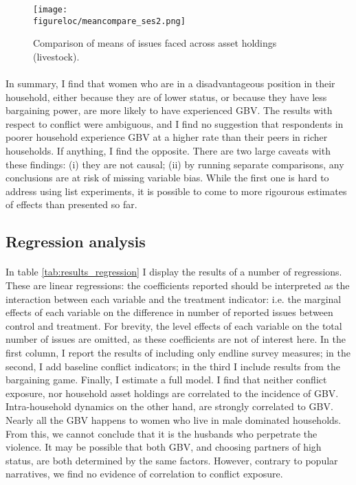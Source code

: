 \documentclass[11pt,a4paper]{scrartcl} %
\newcommand{\figureloc}{C:/Users/Koen/Dropbox/PhD/Papers/CongoGBV/Figures}
\begin{document}
\begin{figure}[H]
\texttt{[image: \\figureloc/meancompare\_ses2.png]}
  \caption{Comparison of means of issues faced across asset holdings (livestock).}
  \label{fig:meancompare_ses2}
\end{figure}

\paragraph{}
In summary, I find that women who are in a disadvantageous position in their household, either because they are of lower status, or because they have less bargaining power, are more likely to have experienced GBV. The results with respect to conflict were ambiguous, and I find no suggestion that respondents in poorer household experience GBV at a higher rate than their peers in richer households. If anything, I find the opposite. There are two large caveats with these findings: (i) they are not causal; (ii) by running separate comparisons, any conclusions are at risk of missing variable bias. While the first one is hard to address using list experiments, it is possible to come to more rigourous estimates of effects than presented so far. 

\subsection*{Regression analysis}
\paragraph{}
In table \ref{tab:results_regression} I display the results of a number of regressions. These are linear regressions: the coefficients reported should be interpreted as the interaction between each variable and the treatment indicator: i.e. the marginal effects of each variable on the difference in number of reported issues between control and treatment. For brevity, the level effects of each variable on the total number of issues are omitted, as these coefficients are not of interest here. In the first column, I report the results of including only endline survey measures; in the second, I add baseline conflict indicators; in the third I include results from the bargaining game. Finally, I estimate a full model. I find that neither conflict exposure, nor household asset holdings are correlated to the incidence of GBV. Intra-household dynamics on the other hand, are strongly correlated to GBV. Nearly all the GBV happens to women who live in male dominated households. From this, we cannot conclude that it is the husbands who perpetrate the violence. It may be possible that both GBV, and choosing partners of high status, are both determined by the same factors. However, contrary to popular narratives, we find no evidence of correlation to conflict exposure.
\end{document}
